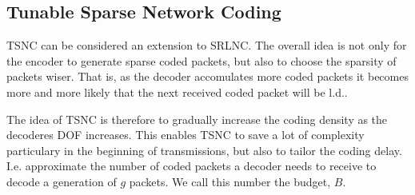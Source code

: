

%

\subsection{Tunable Sparse Network Coding}

\ac{TSNC} can be considered an extension to \ac{SRLNC}. The overall idea is
not only for the encoder to generate sparse coded packets, but also to
choose the sparsity of packets wiser. That is, as the decoder accomulates more
coded packets it becomes more and more likely that the next received
coded packet will be \ac{l.d.}.

The idea of \ac{TSNC} is therefore to gradually increase the coding density
as the decoderes \ac{DOF} increases. This enables TSNC to save a lot of
complexity particulary in the beginning of transmissions, but also to
tailor the coding delay. I.e. approximate the number of coded packets a
decoder needs to receive to decode a generation of $g$ packets. We call
this number the budget, $B$.

